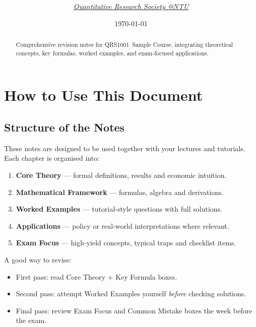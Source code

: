\documentclass[12pt]{article}
\title{
\Huge \CourseCode\ \CourseName \\[0.3em]
\Large \AcademicYear
}
\author{
  \textit{\href{https://qrsntu.org}{Quantitative Research Society @NTU}}
}
\date{\today}
\newcommand{\CourseCode}{QRS1001}
\newcommand{\CourseName}{Sample Course}
\begin{document}
\maketitle
\thispagestyle{plainfirst}

\begin{abstract}
\noindent
Comprehensive revision notes for \CourseCode\ \CourseName, integrating theoretical concepts, key formulas, worked examples, and exam-focused applications.
\end{abstract}

\vspace{0.5cm}
\tableofcontents
\newpage

\fontsize{10.5pt}{11.5pt}\selectfont
\pagestyle{main}

\section*{How to Use This Document}

\subsection*{Structure of the Notes}

These notes are designed to be used together with your lectures and tutorials. Each chapter is organised into:

\begin{enumerate}
    \item \textbf{Core Theory} — formal definitions, results and economic intuition.
    \item \textbf{Mathematical Framework} — formulas, algebra and derivations.
    \item \textbf{Worked Examples} — tutorial-style questions with full solutions.
    \item \textbf{Applications} — policy or real-world interpretations where relevant.
    \item \textbf{Exam Focus} — high-yield concepts, typical traps and checklist items.
\end{enumerate}

A good way to revise:
\begin{itemize}
    \item First pass: read Core Theory + Key Formula boxes.
    \item Second pass: attempt Worked Examples yourself \emph{before} checking solutions.
    \item Final pass: review Exam Focus and Common Mistake boxes the week before the exam.
\end{itemize}
\end{document}
